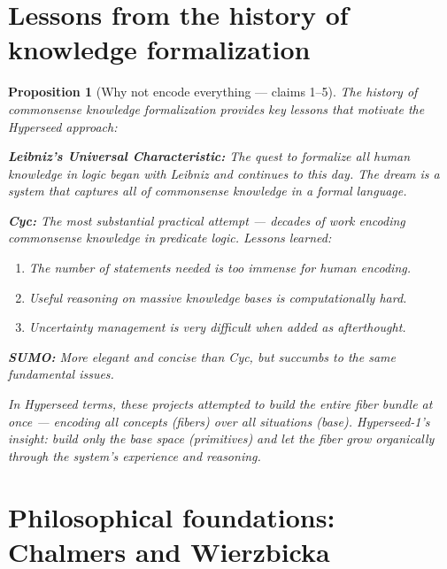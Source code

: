 \documentclass[11pt,a4paper]{article}
\newtheorem{proposition}[definition]{Proposition}
\begin{document}
\section{Lessons from the history of knowledge formalization}
\label{sec:history}

\begin{proposition}[Why not encode everything --- claims 1--5]
\label{prop:history}
The history of commonsense knowledge formalization provides key lessons
that motivate the Hyperseed approach:

\textbf{Leibniz's Universal Characteristic:} The quest to formalize all
human knowledge in logic began with Leibniz and continues to this day.
The dream is a system that captures all of commonsense knowledge in a
formal language.

\textbf{Cyc:} The most substantial practical attempt --- decades of work
encoding commonsense knowledge in predicate logic. Lessons learned:
\begin{enumerate}
\item The number of statements needed is too immense for human encoding.
\item Useful reasoning on massive knowledge bases is computationally hard.
\item Uncertainty management is very difficult when added as afterthought.
\end{enumerate}

\textbf{SUMO:} More elegant and concise than Cyc, but succumbs to the
same fundamental issues.

In Hyperseed terms, these projects attempted to build the \emph{entire
fiber bundle at once} --- encoding all concepts (fibers) over all
situations (base). Hyperseed-1's insight: build only the \emph{base
space} (primitives) and let the fiber grow organically through the
system's experience and reasoning.
\end{proposition}

\section{Philosophical foundations: Chalmers and Wierzbicka}
\label{sec:philosophical}
\end{document}
